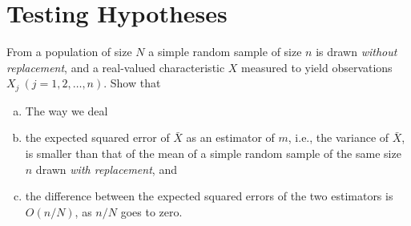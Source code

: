 \chapter{Testing Hypotheses}
\begin{exer}
	From a population of size $N$ a simple random sample of size $n$ is drawn \textit{without replacement}, and a real-valued characteristic $X$ measured to yield observations $X_j~(j=1,2,\ldots,n)$. Show that
	\begin{enumerate}[(a)]
		\item 
		The way we deal
		\item the expected squared error of $\bar{X}$ as an estimator of $m$, i.e., the variance of $\bar{X}$, is smaller than that of the mean of a simple random sample of the same size $n$ drawn \textit{with replacement}, and
		\item the difference between the expected squared errors of the two estimators is $O(n/N)$, as $n/N$ goes to zero.
	\end{enumerate}
\end{exer}
